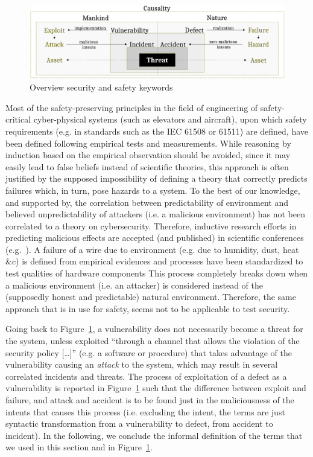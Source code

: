 \documentclass{article}
\theoremstyle{definition}
\theoremstyle{corollary}
\theoremstyle{lemma}
\theoremstyle{theorem}
\theoremstyle{theorem}
\begin{document}
\begin{figure}[t]
	\centering
	\includegraphics[width=\textwidth]{safety-security.pdf}
	\caption{Overview security and safety keywords}
	\label{fig:safety-security}
\end{figure}

Most of the safety-preserving principles in the field of engineering of
safety-critical cyber-physical systems (such as elevators and aircraft), upon
which safety requirements (e.g. in standards such as the IEC 61508 or 61511\autocite{IEC201761511}) are defined, have
been defined following empirical tests and measurements. While reasoning by
induction based on the empirical observation should be avoided, since it may
easily lead to false beliefs instead of scientific theories, this approach is
often justified by the supposed impossibility of defining a theory that
correctly predicts failures which, in turn, pose hazards to a system. 
To the best of our knowledge, and supported by\autocite{Herley2016unfalsifiability}, the
correlation between predictability of environment and believed unpredictability
of attackers (i.e. a malicious
environment) has not been correlated to a theory on cybersecurity. 
Therefore, inductive research efforts in
predicting malicious effects are accepted (and published) in scientific
conferences (e.g.~\autocite{Rocchetto2014CSRF}). A failure of a wire due to
environment (e.g. due to humidity, dust, heat \&c) is defined from empirical
evidences and processes have been standardized to test qualities of hardware components
This process completely breaks down when a malicious environment (i.e. an attacker)
is considered instead of the (supposedly honest and predictable)
natural environment. Therefore, the same approach that is in use for safety,
seems not to be applicable to test security.

Going back to Figure~\ref{fig:safety-security}, a vulnerability does not
necessarily become a threat for the system, unless exploited ``through a
channel that allows the violation of the security policy
[\ldots]''\autocite{cnssi20104009} (e.g. a software or procedure) that takes
advantage of the vulnerability causing an \emph{attack} to the system, which may
result in several correlated incidents and threats.  The process of
exploitation of a defect as a vulnerability is reported in
Figure~\ref{fig:safety-security} such that the difference between exploit and failure,
and attack and accident is to be found just in the maliciousness of the intents
that causes this process (i.e. excluding the intent, the terms are just syntactic transformation from a vulnerability to defect, from
accident to incident). In the following, we conclude the informal definition of
the terms that we used in this section and in Figure~\ref{fig:safety-security}.
\end{document}
